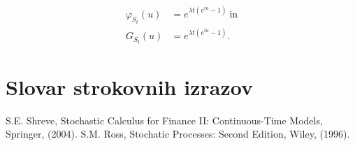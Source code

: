 \documentclass[12pt,a4paper]{amsart}
\theoremstyle{definition} %
\theoremstyle{plain} %
\newcommand{\geslo}[2]{\noindent\textbf{#1}\hspace*{3mm}\hangindent=\parindent\hangafter=1 #2}
\newcommand{\1}{\mathds{1}}
\begin{document}
    \begin{align*}
        \varphi_{S_t}(u) &= e^{\lambda t\left(e^{iu} - 1\right)} \ \text{in} \\
        G_{S_t}(u) &= e^{\lambda t\left(e^{iu} - 1\right)}.
    \end{align*} 













\section*{Slovar strokovnih izrazov}

%
%


\begin{thebibliography}{99}

S.E. Shreve, Stochastic Calculus for Finance II: Continuous-Time Models, Springer, (2004).
S.M. Ross, Stochatic Processes: Second Edition, Wiley, (1996).
\end{thebibliography}
\end{document}
